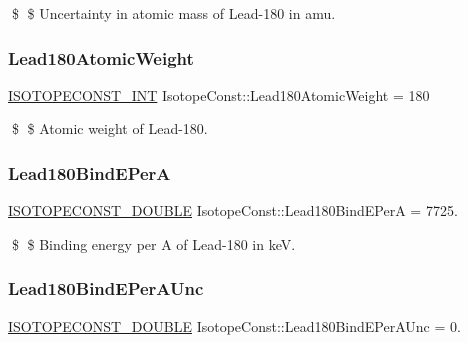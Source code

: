 \$ \$ Uncertainty in atomic mass of Lead-\/180 in amu. \mbox{\label{group___isotope_const-_lead-_pb180_ga22228ce7daa0cf1ee1cd05462d80c2b7}} 
\subsubsection{\texorpdfstring{Lead180\+Atomic\+Weight}{Lead180AtomicWeight}}
{\footnotesize\ttfamily \mbox{\hyperlink{group___isotope_const-_macros_ga5f18360b3e99483a35c32d789e62621c}{I\+S\+O\+T\+O\+P\+E\+C\+O\+N\+S\+T\+\_\+\+I\+NT}} Isotope\+Const\+::\+Lead180\+Atomic\+Weight = 180}

\$ \$ Atomic weight of Lead-\/180. \mbox{\label{group___isotope_const-_lead-_pb180_ga752a5da9ce2f27a427ef0a8c30519dbe}} 
\subsubsection{\texorpdfstring{Lead180\+Bind\+E\+PerA}{Lead180BindEPerA}}
{\footnotesize\ttfamily \mbox{\hyperlink{group___isotope_const-_macros_ga8f45a7272ce02c0b4c65c44636ed719a}{I\+S\+O\+T\+O\+P\+E\+C\+O\+N\+S\+T\+\_\+\+D\+O\+U\+B\+LE}} Isotope\+Const\+::\+Lead180\+Bind\+E\+PerA = 7725.}

\$ \$ Binding energy per A of Lead-\/180 in keV. \mbox{\label{group___isotope_const-_lead-_pb180_ga40ac959f9ece70b4a437ffc30289c256}} 
\subsubsection{\texorpdfstring{Lead180\+Bind\+E\+Per\+A\+Unc}{Lead180BindEPerAUnc}}
{\footnotesize\ttfamily \mbox{\hyperlink{group___isotope_const-_macros_ga8f45a7272ce02c0b4c65c44636ed719a}{I\+S\+O\+T\+O\+P\+E\+C\+O\+N\+S\+T\+\_\+\+D\+O\+U\+B\+LE}} Isotope\+Const\+::\+Lead180\+Bind\+E\+Per\+A\+Unc = 0.}

